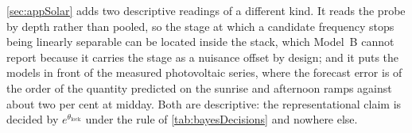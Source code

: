 \autoref{sec:appSolar} adds two descriptive readings of a different kind. It reads the probe by depth rather than pooled, so the stage at which a candidate frequency stops being linearly separable can be located inside the stack, which Model~B cannot report because it carries the stage as a nuisance offset by design; and it puts the models in front of the measured photovoltaic series, where the forecast error is of the order of the quantity predicted on the sunrise and afternoon ramps against about two per cent at midday. Both are descriptive: the representational claim is decided by $e^{\theta_{\mathrm{lock}}}$ under the rule of \autoref{tab:bayesDecisions} and nowhere else.
